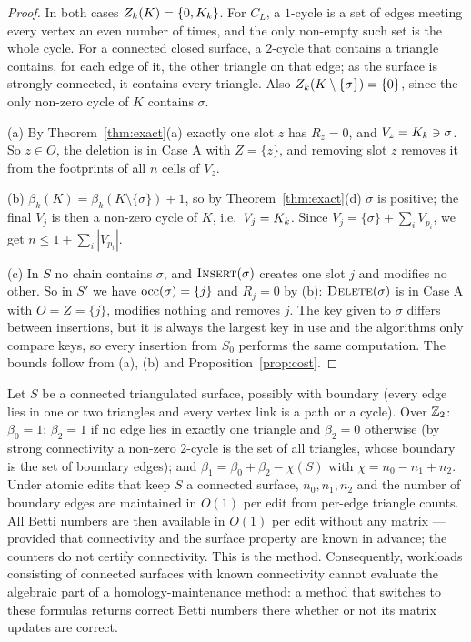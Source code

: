 \begin{proof}
In both cases $Z_{k}(K)=\{0,K_{k}\}$. For $C_L$, a $1$-cycle is a set of edges
meeting every vertex an even number of times, and the only non-empty such set is
the whole cycle. For a connected closed surface, a $2$-cycle that contains a
triangle contains, for each edge of it, the other triangle on that edge; as the
surface is strongly connected, it contains every triangle. Also
$Z_{k}(K\setminus\{\sigma\})=\{0\}$, since the only non-zero cycle of $K$
contains $\sigma$.

(a) By Theorem~\ref{thm:exact}(a) exactly one slot $z$ has $R_z=0$, and
$V_z=K_{k}\ni\sigma$. So $z\in O$, the deletion is in Case A with $Z=\{z\}$, and
removing slot $z$ removes it from the footprints of all $n$ cells of $V_z$.

(b) $\beta_k(K)=\beta_k(K\setminus\{\sigma\})+1$, so by
Theorem~\ref{thm:exact}(d) $\sigma$ is positive; the final $V_j$ is then a non-zero
cycle of $K$, i.e.\ $V_j=K_{k}$. Since $V_j=\{\sigma\}+\sum_iV_{p_i}$, we get
$n\le1+\sum_i|V_{p_i}|$.

(c) In $S$ no chain contains $\sigma$, and $\textup{\textsc{Insert}}(\sigma)$ creates one slot $j$
and modifies no other. So in $S'$ we have $\operatorname{occ}(\sigma)=\{j\}$ and $R_j=0$ by
(b): $\textup{\textsc{Delete}}(\sigma)$ is in Case A with $O=Z=\{j\}$, modifies nothing and removes
$j$. The key given to $\sigma$ differs between insertions, but it is always the
largest key in use and the algorithms only compare keys, so every insertion from
$S_0$ performs the same computation. The bounds follow from (a), (b) and
Proposition~\ref{prop:cost}.
\end{proof}

\begin{remark}\label{rem:surfaces}
Let $S$ be a connected triangulated surface, possibly with boundary (every edge
lies in one or two triangles and every vertex link is a path or a cycle). Over
$\mathbb{Z}_2$: $\beta_0=1$; $\beta_2=1$ if no edge lies in exactly one triangle and
$\beta_2=0$ otherwise (by strong connectivity a non-zero $2$-cycle is the set of
all triangles, whose boundary is the set of boundary edges); and
$\beta_1=\beta_0+\beta_2-\chi(S)$ with $\chi=n_0-n_1+n_2$. Under atomic edits that
keep $S$ a connected surface, $n_0,n_1,n_2$ and the number of boundary edges are
maintained in $O(1)$ per edit from per-edge triangle counts. All Betti numbers
are then available in $O(1)$ per edit without any matrix --- provided that
connectivity and the surface property are known in advance; the counters do not
certify connectivity. This is the  method. Consequently, workloads
consisting of connected surfaces with known connectivity cannot evaluate the
algebraic part of a homology-maintenance method: a method that switches to these
formulas returns correct Betti numbers there whether or not its matrix updates
are correct.
\end{remark}
